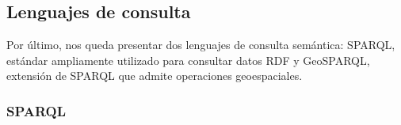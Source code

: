 \subsection{Lenguajes de consulta}


Por último, nos queda presentar dos lenguajes de consulta semántica: SPARQL, estándar ampliamente utilizado para consultar datos RDF y GeoSPARQL, extensión de SPARQL que admite operaciones geoespaciales.


\subsubsection{SPARQL}




